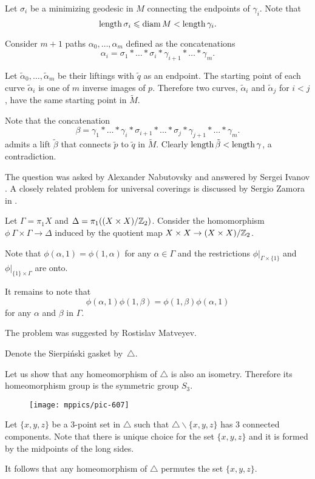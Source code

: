 Let $\sigma_i$ be a minimizing geodesic in $M$ connecting the endpoints of $\gamma_i$. 
Note that 
\[\operatorname{\rm length}\sigma_i\leqslant \operatorname{\rm diam}\nolimits M< \operatorname{\rm length}\gamma_i.\] 

Consider $m+1$ paths $\alpha_0,\dots,\alpha_m$ defined as the concatenations 
\[\alpha_i=\sigma_1{*}\dots{*}\sigma_i{*}\gamma_{i+1}{*}\dots{*}\gamma_m.\]

Let $\tilde\alpha_0,\dots,\tilde\alpha_m$ be their liftings
with $\tilde q$ as an endpoint.
The starting point of each curve $\tilde\alpha_i$ is one of $m$ inverse images of $p$. 
Therefore two curves, $\tilde\alpha_i$ and $\tilde\alpha_j$ for $i<j$, 
have the same starting point in $\tilde M$.

Note that the concatenation
\[\beta=\gamma_1{*}\dots{*}\gamma_i{*}\sigma_{i+1}{*}\dots{*}\sigma_j{*}\gamma_{j+1}{*}\dots{*}\gamma_m.\]
admits a lift $\tilde\beta$ that connects $\tilde p$ to $\tilde q$ in $\tilde M$.
Clearly $\operatorname{\rm length} \tilde\beta<\operatorname{\rm length} \gamma$, a contradiction.
\qeds

The question was asked by Alexander  Nabutovsky
and answered by Sergei Ivanov \cite{ivanov}.
A closely related problem for universal coverings is discussed by Sergio Zamora in \cite{zamora}.



Let $\Gamma=\pi_1 X$ and $\Delta=\pi_1((X\times X)/\mathbb{Z}_2)$.
Consider the homomorphism $\phi\:\Gamma\times \Gamma\to \Delta$
induced by the quotient map $X\times X\z\to (X\times X)/\ZZ_2$.

Note that $\phi(\alpha,1)=\phi(1,\alpha)$ for any $\alpha\in \Gamma$ and the restrictions $\phi|_{\Gamma\times \{1\}}$ and $\phi|_{\{1\}\times\Gamma}$
are onto.

It remains to note that 
$$\phi(\alpha,1)\phi(1,\beta)=\phi(1,\beta)\phi(\alpha,1)$$
for any $\alpha$ and $\beta$ in $\Gamma$.
\qeds

 
The problem was suggested by Rostislav Matveyev.




Denote the Sierpi\'nski gasket by~$\triangle$.

Let us show that any homeomorphism of $\triangle$ is also an isometry.
Therefore its homeomorphism group is the symmetric group $S_3$. 

{

\begin{wrapfigure}{r}{23 mm}
\vskip-4mm
\centering
\texttt{[image: mppics/pic-607]}
\end{wrapfigure}
Let $\{x,y,z\}$ be a 3-point set in $\triangle$ such that $\triangle \backslash\{x,y,z\}$ has 3 connected components.
Note that there is unique choice for the set $\{x,y,z\}$ and 
it is formed by the midpoints of the long sides.

It follows that any homeomorphism of $\triangle$ permutes the set $\{x,y,z\}$.

}

